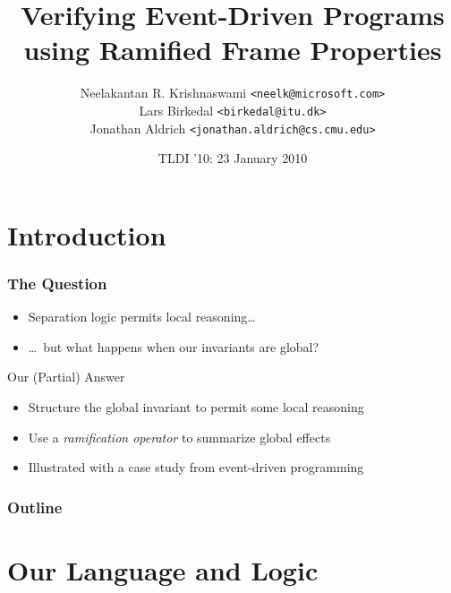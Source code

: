\documentclass[svgnames]{beamer}
\title{Verifying Event-Driven Programs using Ramified Frame Properties}
\author{Neelakantan R. Krishnaswami \texttt{<neelk@microsoft.com>} \\
        Lars Birkedal \texttt{<birkedal@itu.dk>} \\
        Jonathan Aldrich \texttt{<jonathan.aldrich@cs.cmu.edu>}}
\date{TLDI '10: 23 January 2010}
\begin{document}
\begin{frame}
  \titlepage
\end{frame}

\section{Introduction}

\begin{frame}
  \frametitle{The Question}

    \begin{itemize}
      \item Separation logic permits local reasoning\ldots \pause
      \item \ldots\ but what happens when our invariants are global? \pause
    \end{itemize}

  \begin{block}{Our (Partial) Answer}
    \begin{itemize}
      \pause\item Structure the global invariant to permit some local reasoning
      \pause\item Use a \emph{ramification operator} to summarize global effects
      \pause\item Illustrated with a case study from event-driven programming
    \end{itemize}
  \end{block}
\end{frame}

\begin{frame}
  \frametitle{Outline}
  \tableofcontents
\end{frame}

\section{Our Language and Logic}
\end{document}
